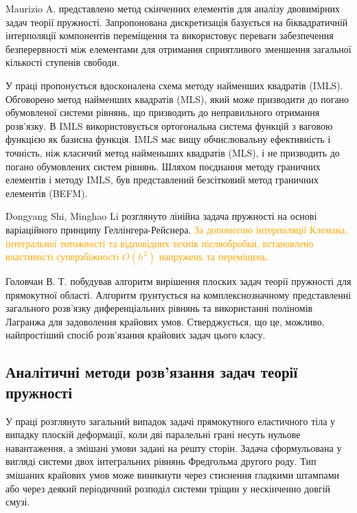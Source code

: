 Maurizio A. \cite{maurizio_1} представлено метод скінченних елементів для аналізу двовимірних задач теорії пружності.
Запропонована дискретизація базується на біквадратичній інтерполяції компонентів переміщення та
використовує переваги забезпечення безперервності між елементами для отримання сприятливого зменшення загальної кількості ступенів свободи.

У праці \cite{liew_1} пропонується вдосконалена схема методу найменших квадратів (IMLS).
Обговорено метод найменших квадратів (MLS), який може призводити до погано обумовленої системи рівнянь,
що призводить до неправильного отримання розв'язку.
В IMLS використовується ортогональна система функцій з ваговою функцією як базисна функція.
IMLS має вищу обчислювальну ефективність і точність, ніж класичий метод найменьших квадратів (MLS),
і не призводить до погано обумовлених систем рівнянь.
Шляхом поєднання методу граничних елементів і методу IMLS, був представлений безсітковий метод граничних елементів (BEFM).

Dongyang Shi, Minghao Li \cite{dong_1} розглянуто лінійна задача пружності на основі варіаційного принципу Геллінгера-Рейснера.
\textcolor{orange}{За допомогою інтерполяції Клемана, інтегральної тотожності та відповідних технік післяобробки,
встановлено властивості суперзбіжності $O(h^2)$ напружень та переміщень.}

Головчан В. Т. \cite{golovchan_1} побудував алгоритм вирішення плоских задач теорії пружності для прямокутної області.
Алгоритм ґрунтується на комплекснозначному представленні загального розв'язку диференціальних рівнянь
та використанні поліномів Лагранжа для задоволення крайових умов.
Стверджується, що це, можливо, найпростіший спосіб розв'язання крайових задач цього класу.

\subsection{Аналітичні методи розв'язання задач теорії пружності}


У праці \cite{shyam_1} розглянуто загальний випадок задачі прямокутного еластичного тіла у випадку плоскій деформації,
коли дві паралельні грані несуть нульове навантаження, а змішані умови задані на решту сторін.
Задача сформульована у вигляді системи двох інтегральних рівнянь Фредгольма другого роду.
Тип змішаних крайових умов може виникнути через стиснення гладкими штампами або через деякий періодичний розподіл системи тріщин у нескінченно довгій смузі.